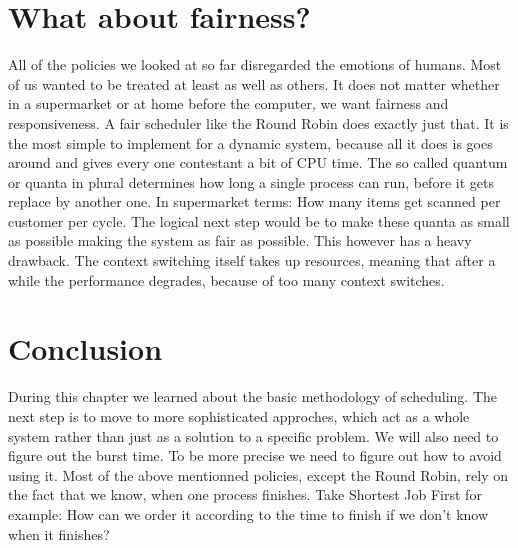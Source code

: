 \section{What about fairness?} \label{sec:rr}

All of the policies we looked at so far disregarded the emotions of humans.
Most of us wanted to be treated at least as well as others.
It does not matter whether in a supermarket or at home before the computer, we want fairness and responsiveness.
A fair scheduler like the Round Robin does exactly just that. 
It is the most simple to implement for a dynamic system, because all it does is goes around and gives every one contestant a bit of CPU time.
The so called quantum or quanta in plural determines how long a single process can run, before it gets replace by another one.
In supermarket terms: How many items get scanned per customer per cycle.
The logical next step would be to make these quanta as small as possible making the system as fair as possible.
This however has a heavy drawback.
The context switching itself takes up resources, meaning that after a while the performance degrades, because of too many context switches.



 \section{Conclusion}

During this chapter we learned about the basic methodology of scheduling.
The next step is to move to more sophisticated approches, which act as a whole system rather than just as a solution to a specific problem.
We will also need to figure out the burst time.
To be more precise we need to figure out how to avoid using it.
Most of the above mentionned policies, except the Round Robin, rely on the fact that we know, when one process finishes.
Take Shortest Job First for example: How can we order it according to the time to finish if we don't know when it finishes?